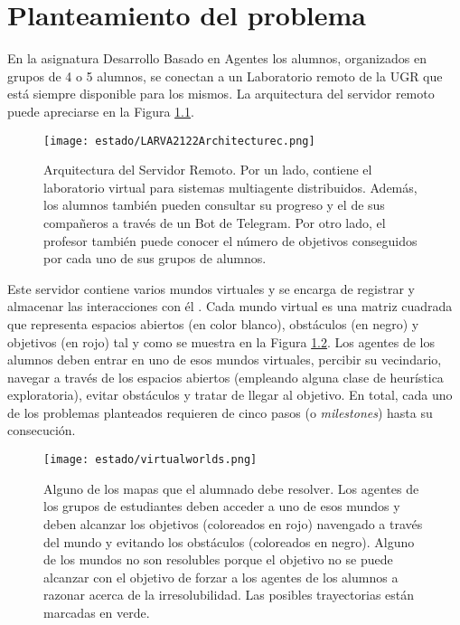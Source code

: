 \chapter{Planteamiento del problema}\label{sec:chapterI}

En la asignatura Desarrollo Basado en Agentes los alumnos, organizados en grupos de 4 o 5 alumnos, se conectan a un Laboratorio remoto de la UGR que está siempre disponible para los mismos. La arquitectura del servidor remoto puede apreciarse en la Figura \ref{fig:architecture}.

\begin{figure}[H]
    \centering
    \texttt{[image: estado/LARVA2122Architecturec.png]}
    \caption{Arquitectura del Servidor Remoto. Por un lado, contiene el laboratorio virtual para sistemas multiagente distribuidos. Además, los alumnos también pueden consultar su progreso y el de sus compañeros a través de un Bot de Telegram. Por otro lado, el profesor también puede conocer el número de objetivos conseguidos por cada uno de sus grupos de alumnos.}
    \label{fig:architecture}
\end{figure}

Este servidor contiene varios mundos virtuales y se encarga de registrar y almacenar las interacciones con él \cite{Vidal_2016}. Cada mundo virtual es una matriz cuadrada que representa espacios abiertos (en color blanco), obstáculos (en negro) y objetivos (en rojo) tal y como se muestra en la Figura \ref{fig:map}. Los agentes de los alumnos deben entrar en uno de esos mundos virtuales, percibir su vecindario, navegar a través de los espacios abiertos (empleando alguna clase de heurística exploratoria), evitar obstáculos y tratar de llegar al objetivo. En total, cada uno de los problemas planteados requieren de cinco pasos (o \emph{milestones}) hasta su consecución.

\begin{figure}[H]
    \centering
    \texttt{[image: estado/virtualworlds.png]}
    \caption{Alguno de los mapas que el alumnado debe resolver. Los agentes de los grupos de estudiantes deben acceder a uno de esos mundos y deben alcanzar los objetivos (coloreados en rojo) navengado a través del mundo y evitando los obstáculos (coloreados en negro). Alguno de los mundos no son resolubles porque el objetivo no se puede alcanzar con el objetivo de forzar a los agentes de los alumnos a razonar acerca de la irresolubilidad. Las posibles trayectorias están marcadas en verde.}
    \label{fig:map}
\end{figure}

